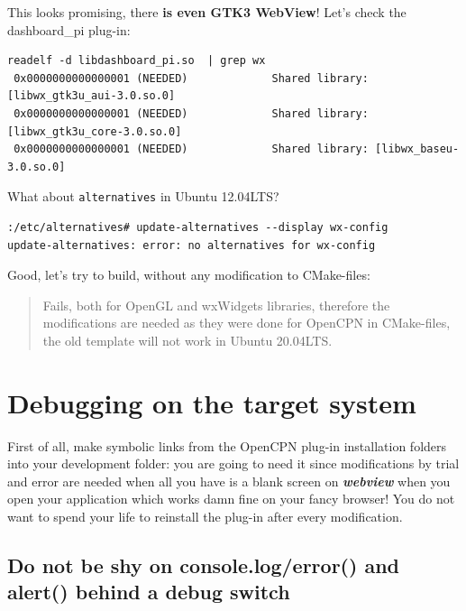 \documentclass[11pt]{article}
\begin{document}
    This looks promising, there \textbf{is even GTK3 WebView}! Let's check
the dashboard\_pi plug-in:

    \begin{verbatim}
readelf -d libdashboard_pi.so  | grep wx
 0x0000000000000001 (NEEDED)             Shared library: [libwx_gtk3u_aui-3.0.so.0]
 0x0000000000000001 (NEEDED)             Shared library: [libwx_gtk3u_core-3.0.so.0]
 0x0000000000000001 (NEEDED)             Shared library: [libwx_baseu-3.0.so.0]
\end{verbatim}

    What about \texttt{alternatives} in Ubuntu 12.04LTS?

    \begin{verbatim}
:/etc/alternatives# update-alternatives --display wx-config
update-alternatives: error: no alternatives for wx-config
\end{verbatim}

    Good, let's try to build, without any modification to CMake-files:

    \begin{quote}
Fails, both for OpenGL and wxWidgets libraries, therefore the
modifications are needed as they were done for OpenCPN in CMake-files,
the old template will not work in Ubuntu 20.04LTS.
\end{quote}

    \hypertarget{debugging-on-the-target-system}{%
\section{Debugging on the target
system}\label{debugging-on-the-target-system}}

    First of all, make symbolic links from the OpenCPN plug-in installation
folders into your development folder: you are going to need it since
modifications by trial and error are needed when all you have is a blank
screen on \textbf{\emph{webview}} when you open your application which
works damn fine on your fancy browser! You do not want to spend your
life to reinstall the plug-in after every modification.

    \hypertarget{do-not-be-shy-on-console.logerror-and-alert-behind-a-debug-switch}{%
\subsection{Do not be shy on console.log/error() and alert() behind a
debug
switch}\label{do-not-be-shy-on-console.logerror-and-alert-behind-a-debug-switch}}
\end{document}
